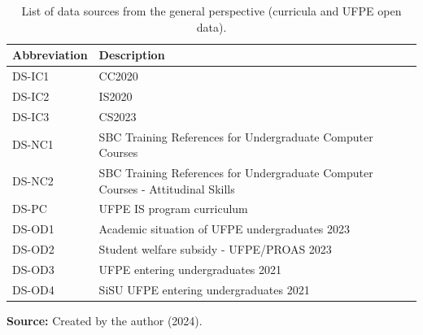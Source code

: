 \begin{table}[htb]
\caption{List of data sources from the general perspective (curricula and \acrshort{UFPE} open data).}
\label{tbl:general-data-sources}
\centering
{}
\begin{tabular}{
    >{\centering\arraybackslash}m{3cm}|
    >{\centering\arraybackslash}m{11cm}
}
    \hline
    \textbf{Abbreviation} &
    \textbf{Description} \\
    
    \hline
    \acrshort{DS-IC}1 &
    \acrfull{CC2020} \\

    \acrshort{DS-IC}2&
    \acrfull{IS2020} \\

    \acrshort{DS-IC}3 &
    \acrfull{CS2023} \\

    \hline
    \acrshort{DS-NC}1 &
    \acrshort{SBC} Training References for Undergraduate Computer Courses \\

   \acrshort{DS-NC}2 &
    \acrshort{SBC} Training References for Undergraduate Computer Courses - Attitudinal Skills \\

    \hline
    \acrshort{DS-PC} &
    \acrshort{UFPE} \acrfull{IS} program curriculum \\

    \hline
    \acrshort{DS-OD}1 &
    Academic situation of \acrshort{UFPE} undergraduates 2023 \\

    \acrshort{DS-OD}2 &
    Student welfare subsidy - \acrshort{UFPE}/\acrshort{PROAS} 2023\\

    \acrshort{DS-OD}3 & \acrshort{UFPE} entering undergraduates 2021 \\

    \acrshort{DS-OD}4 &
    \acrshort{SiSU} \acrshort{UFPE} entering undergraduates 2021\\
    
    \hline
    
\end{tabular}

\par\medskip\ABNTEXfontereduzida\selectfont\textbf{Source:} Created by the author (2024). \par\medskip

\end{table}

